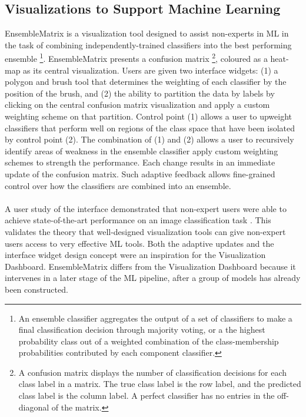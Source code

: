 \documentclass{sigchi}
\begin{document}
\subsection{Visualizations to Support Machine Learning}
%
%
EnsembleMatrix\cite{talbot2009ensemblematrix} is a visualization tool designed to assist non-experts in ML in the task of combining independently-trained classifiers into the best performing ensemble%
%
\footnote{An ensemble classifier aggregates the output of a set of classifiers to make a final classification decision through majority voting, or a the highest probability class out of a weighted combination of the class-membership probabilities contributed by each component classifier.}. %
%
EnsembleMatrix presents a confusion matrix%
%
\footnote{A confusion matrix displays the number of classification decisions for each class label in a matrix. The true class label is the row label, and the predicted class label is the column label. A perfect classifier has no entries in the off-diagonal of the matrix.}, %
%
coloured as a heat-map as its central visualization. %
%
Users are given two interface widgets: (1) a polygon and brush tool that determines the weighting of each classifier by the position of the brush, and (2) the ability to partition the data by labels by clicking on the central confusion matrix visualization and apply a custom weighting scheme on that partition. %
%
Control point (1) allows a user to upweight classifiers that perform well on regions of the class space that have been isolated by control point (2). %
%
The combination of (1) and (2) allows a user to recursively identify areas of weakness in the ensemble classifier apply custom weighting schemes to strength the performance. %
%
Each change results in an immediate update of the confusion matrix. %
%
Such adaptive feedback allows fine-grained control over how the classifiers are combined into an ensemble. %
\\\\
A user study of the interface demonstrated that non-expert users were able to achieve state-of-the-art performance on an image classification task \cite{talbot2009ensemblematrix}. %
%
This validates the theory that well-designed visualization tools can give non-expert users access to very effective ML tools. %
%
Both the adaptive updates and the interface widget design concept were an inspiration for the Visualization Dashboard. %
%
EnsembleMatrix differs from the Visualization Dashboard because it intervenes in a later stage of the ML pipeline, after a group of models has already been constructed. %
\end{document}
